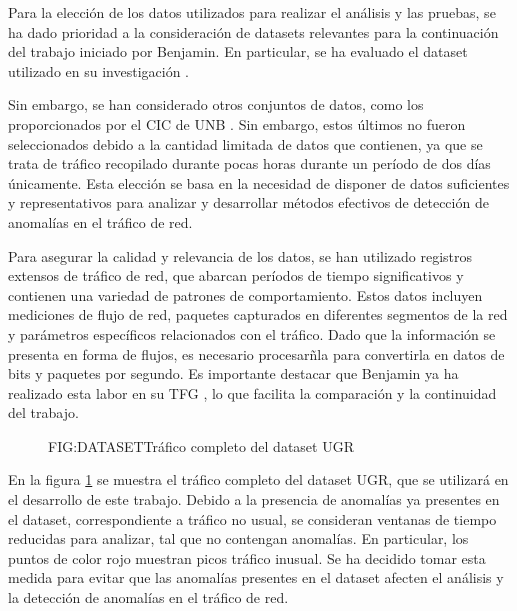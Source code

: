 Para la elección de los datos utilizados para realizar el análisis y las pruebas, se ha dado prioridad a la consideración de datasets relevantes para la continuación del trabajo iniciado por Benjamin. En particular, se ha evaluado el dataset utilizado en su investigación \cite{datosugr16}. 

Sin embargo, se han considerado otros conjuntos de datos, como los proporcionados por el \ac{CIC} de \ac{UNB} \cite{datosunb19}. Sin embargo, estos últimos no fueron seleccionados debido a la cantidad limitada de datos que contienen, ya que se trata de tráfico recopilado durante pocas horas durante un período de dos días únicamente. Esta elección se basa en la necesidad de disponer de datos suficientes y representativos para analizar y desarrollar métodos efectivos de detección de anomalías en el tráfico de red.

Para asegurar la calidad y relevancia de los datos, se han utilizado registros extensos de tráfico de red, que abarcan períodos de tiempo significativos y contienen una variedad de patrones de comportamiento. Estos datos incluyen mediciones de flujo de red, paquetes capturados en diferentes segmentos de la red y parámetros específicos relacionados con el tráfico. Dado que la información se presenta en forma de flujos, es necesario procesarñla para convertirla en datos de bits y paquetes por segundo.
Es importante destacar que Benjamin ya ha realizado esta labor en su \ac{TFG} \cite{benjamin2021}, lo que facilita la comparación y la continuidad del trabajo.

\begin{figure}[Tráfico completo del dataset UGR]{FIG:DATASET}{Tráfico completo del dataset UGR}
    \label{FIG:DATASET}
\end{figure}

En la figura \ref{FIG:DATASET} se muestra el tráfico completo del dataset UGR, que se utilizará en el desarrollo de este trabajo. Debido a la presencia de anomalías ya presentes en el dataset, correspondiente a tráfico no usual, se consideran ventanas de tiempo reducidas para analizar, tal que no contengan anomalías. En particular, los puntos de color rojo muestran picos tráfico inusual. Se ha decidido tomar esta medida para evitar que las anomalías presentes en el dataset afecten el análisis y la detección de anomalías en el tráfico de red.

